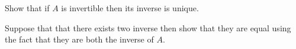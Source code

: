 
\begin{Exercise}[
name={},
title={}, 
difficulty=0,
origin={\cite{YL}}]
Show that if $A$ is invertible then its inverse is unique.
\end{Exercise}

\begin{Answer}
Suppose that that there exists two inverse then show that they are equal using the fact that they are both the inverse of $A$.
\end{Answer}
